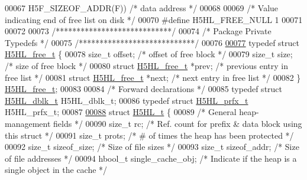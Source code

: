 \begin{DoxyCode}
00067 \textcolor{preprocessor}{        H5F\_SIZEOF\_ADDR(F))         }\textcolor{comment}{/* data address     */}\textcolor{preprocessor}{}
00068 
00069 \textcolor{comment}{/* Value indicating end of free list on disk */}
00070 \textcolor{preprocessor}{#define H5HL\_FREE\_NULL  1}
00071 
00072 
00073 \textcolor{comment}{/****************************/}
00074 \textcolor{comment}{/* Package Private Typedefs */}
00075 \textcolor{comment}{/****************************/}
00076 
\hyperlink{struct_h5_h_l__free__t}{00077} \textcolor{keyword}{typedef} \textcolor{keyword}{struct }\hyperlink{struct_h5_h_l__free__t}{H5HL\_free\_t} \{
00078     \textcolor{keywordtype}{size\_t}              offset;     \textcolor{comment}{/* offset of free block         */}
00079     \textcolor{keywordtype}{size\_t}              size;       \textcolor{comment}{/* size of free block           */}
00080     \textcolor{keyword}{struct }\hyperlink{struct_h5_h_l__free__t}{H5HL\_free\_t}  *prev;      \textcolor{comment}{/* previous entry in free list  */}
00081     \textcolor{keyword}{struct }\hyperlink{struct_h5_h_l__free__t}{H5HL\_free\_t}  *next;      \textcolor{comment}{/* next entry in free list      */}
00082 \} \hyperlink{struct_h5_h_l__free__t}{H5HL\_free\_t};
00083 
00084 \textcolor{comment}{/* Forward declarations */}
00085 \textcolor{keyword}{typedef} \textcolor{keyword}{struct }\hyperlink{struct_h5_h_l__dblk__t}{H5HL\_dblk\_t} H5HL\_dblk\_t;
00086 \textcolor{keyword}{typedef} \textcolor{keyword}{struct }\hyperlink{struct_h5_h_l__prfx__t}{H5HL\_prfx\_t} H5HL\_prfx\_t;
00087 
\hyperlink{struct_h5_h_l__t}{00088} \textcolor{keyword}{struct }\hyperlink{struct_h5_h_l__t}{H5HL\_t} \{
00089     \textcolor{comment}{/* General heap-management fields */}
00090     \textcolor{keywordtype}{size\_t}          rc;                 \textcolor{comment}{/* Ref. count for prefix & data block using this struct         */}
00091     \textcolor{keywordtype}{size\_t}          prots;              \textcolor{comment}{/* # of times the heap has been protected                       */}
00092     \textcolor{keywordtype}{size\_t}          sizeof\_size;        \textcolor{comment}{/* Size of file sizes                                           */}
00093     \textcolor{keywordtype}{size\_t}          sizeof\_addr;        \textcolor{comment}{/* Size of file addresses                                       */}
00094     hbool\_t         single\_cache\_obj;   \textcolor{comment}{/* Indicate if the heap is a single object in the cache         */}

\end{DoxyCode}
